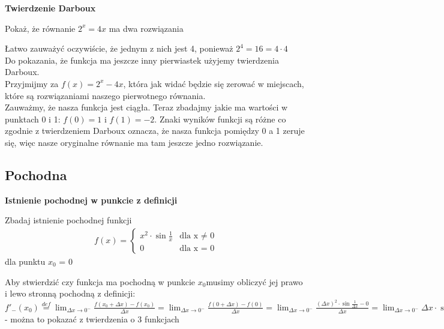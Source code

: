 \documentclass[main.tex]{subfiles}
\begin{document}
    \noindent \textbf{Twierdzenie Darboux}

    \begin{exercise}
        Pokaż, że równanie $2^x = 4x$ ma dwa rozwiązania
    \end{exercise}

    \noindent Łatwo zauważyć oczywiście, że jednym z nich jest 4, ponieważ $2^4 = 16 = 4 \cdot 4$ \\

    \noindent Do pokazania, że funkcja ma jeszcze inny pierwiastek użyjemy twierdzenia Darboux. \\
    Przyjmijmy za $f(x) = 2^x - 4x$, która jak widać będzie się zerować w miejscach, które są rozwiązaniami naszego pierwotnego równania. \\
    Zauważmy, że nasza funkcja jest ciągła. Teraz zbadajmy jakie ma wartości w punktach 0 i 1: $f(0) = 1$ i $f(1) = -2$. Znaki wyników funkcji są różne co zgodnie z twierdzeniem Darboux oznacza,
    że nasza funkcja pomiędzy 0 a 1 zeruje się, więc nasze oryginalne równanie ma tam jeszcze jedno rozwiązanie.


    \subsection{Pochodna}

    \textbf{Istnienie pochodnej w punkcie z definicji} \\

    \begin{exercise}
        Zbadaj istnienie pochodnej funkcji
        \begin{align*}
            f(x) =
            \begin{cases}
                x^2 \cdot \sin{\frac{1}{x}} & \text{dla x $\neq$ 0} \\
                0 & \text{dla x = 0}
            \end{cases}
        \end{align*}
        dla punktu $x_{0}$ = 0
    \end{exercise}

    \noindent Aby stwierdzić czy funkcja ma pochodną w punkcie $x_{0}$musimy obliczyć jej prawo i lewo stronną pochodną z definicji: \\

    \noindent $f'_{-}(x_{0}) \stackrel{def}{=} \lim_{\Delta x \to 0^{-}} \frac{f(x_{0} + \Delta x) - f(x_{0})}{\Delta x} = \lim_{\Delta x \to 0^{-}} \frac{f(0 + \Delta x) - f(0)}{\Delta x} = \lim_{\Delta x \to 0^{-}} \frac{(\Delta x)^2 \cdot \sin{\frac{1}{\Delta x}} - 0}{\Delta x} =
    \lim_{\Delta x \to 0^{-}} \Delta x \cdot \sin{\frac{1}{\Delta x}} = 0$ - można to pokazać z twierdzenia o 3 funkcjach \\
\end{document}
